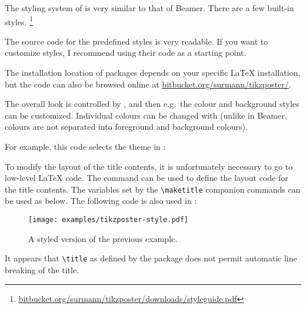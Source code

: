 The styling system of  is very similar to that of Beamer.
There are a few built-in styles.%
\footnote{\url{bitbucket.org/surmann/tikzposter/downloads/styleguide.pdf}}


\begin{technote}
The source code for the predefined styles is very readable.
If you want to customize styles, I recommend using their code as a starting point.

The installation location of packages depends on your specific \LaTeX{} installation,
but the code can also be browsed online at \url{bitbucket.org/surmann/tikzposter/}.
\end{technote}


The overall look is controlled by ,
and then e.g.\ the colour and background styles can be customized.
Individual colours can be changed with 
(unlike in Beamer, colours are not separated into foreground and background colours).

For example, this code selects the theme in :
\begin{ExampleCode}

\end{ExampleCode}

To modify the layout of the title contents,
it is unfortunately necessary to go to low-level \LaTeX{} code.
The  command can be used to define the layout code for the title contents.
The variables set by the \verb|\maketitle| companion commands can be used as below.
The following code is also used in :
%
\begin{ExampleCode}
\settitle{
    \makebox[6cm][c]{\@titlegraphic}
    \parbox[b]{22cm}{
        \color{titlefgcolor} {\bfseries \Huge \@title \par}
        \vspace*{1em}
        {\huge \@author{} \Large (\@institute)}
    }
}
\end{ExampleCode}

\begin{figure}
\centering
\texttt{[image: examples/tikzposter-style.pdf]}
\caption{A styled version of the previous example.}\label{fig:poster styled}
\end{figure}

\begin{technote}
It appears that \verb|\title| as defined by the package
does not permit automatic line breaking of the title.
\end{technote}

